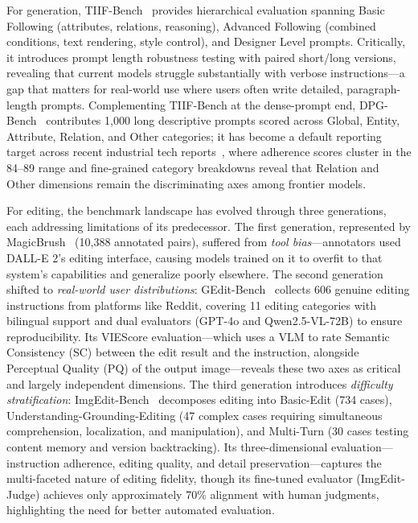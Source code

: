 For generation, TIIF-Bench~\citep{TIIF-Bench} provides hierarchical evaluation spanning Basic Following (attributes, relations, reasoning), Advanced Following (combined conditions, text rendering, style control), and Designer Level prompts. Critically, it introduces prompt length robustness testing with paired short/long versions, revealing that current models struggle substantially with verbose instructions---a gap that matters for real-world use where users often write detailed, paragraph-length prompts. Complementing TIIF-Bench at the dense-prompt end, DPG-Bench~\citep{hu2024ella} contributes 1{,}000 long descriptive prompts scored across Global, Entity, Attribute, Relation, and Other categories; it has become a default reporting target across recent industrial tech reports~\citep{wu2025qwen, team2025longcat, cai2025z, team2026longcat}, where adherence scores cluster in the 84--89 range and fine-grained category breakdowns reveal that Relation and Other dimensions remain the discriminating axes among frontier models.

For editing, the benchmark landscape has evolved through three generations, each addressing limitations of its predecessor. The first generation, represented by MagicBrush~\citep{UltraEdit, AnyEdit} (10,388 annotated pairs), suffered from \emph{tool bias}---annotators used DALL-E 2's editing interface, causing models trained on it to overfit to that system's capabilities and generalize poorly elsewhere. The second generation shifted to \emph{real-world user distributions}: GEdit-Bench~\citep{Liu2025Step1XEditAP} collects 606 genuine editing instructions from platforms like Reddit, covering 11 editing categories with bilingual support and dual evaluators (GPT-4o and Qwen2.5-VL-72B) to ensure reproducibility. Its VIEScore evaluation---which uses a VLM to rate Semantic Consistency (SC) between the edit result and the instruction, alongside Perceptual Quality (PQ) of the output image---reveals these two axes as critical and largely independent dimensions. The third generation introduces \emph{difficulty stratification}: ImgEdit-Bench~\citep{ImgEdit} decomposes editing into Basic-Edit (734 cases), Understanding-Grounding-Editing (47 complex cases requiring simultaneous comprehension, localization, and manipulation), and Multi-Turn (30 cases testing content memory and version backtracking). Its three-dimensional evaluation---instruction adherence, editing quality, and detail preservation---captures the multi-faceted nature of editing fidelity, though its fine-tuned evaluator (ImgEdit-Judge) achieves only approximately 70\% alignment with human judgments, highlighting the need for better automated evaluation.

